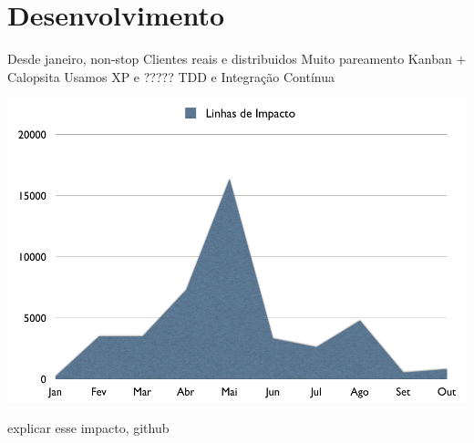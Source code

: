 \section{Desenvolvimento}

Desde janeiro, non-stop
Clientes reais e distribuidos
Muito pareamento
Kanban + Calopsita
Usamos XP e ?????
TDD e Integração Contínua

\includegraphics[scale=0.4]{images/impacto.png}

explicar esse impacto, github

